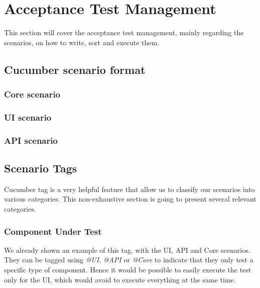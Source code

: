 \section{Acceptance Test Management}\label{sec:acceptance-test-management}

This section will cover the acceptance test management, mainly regarding the
scenarios, on how to write, sort and execute them.

\subsection{Cucumber scenario format}\label{subsec:cucumber-scenario-management}

\subsubsection{Core scenario}

\subsubsection{UI scenario}

\subsubsection{API scenario}

\subsection{Scenario Tags}\label{subsec:scenario-tags}
Cucumber tag is a very helpful feature that allow us to classify our
scenarios into various categories.
This non-exhaustive section is going to present several relevant categories.

\subsubsection{Component Under Test}
We already shown an example of this tag, with the UI, API and Core scenarios.
They can be tagged using \textit{@UI}, \textit{@API} or \textit{@Core} to
indicate that they only test a specific type of component.
Hence it would be possible to easily execute the test only for the UI, which
would avoid to execute everything at the same time.

